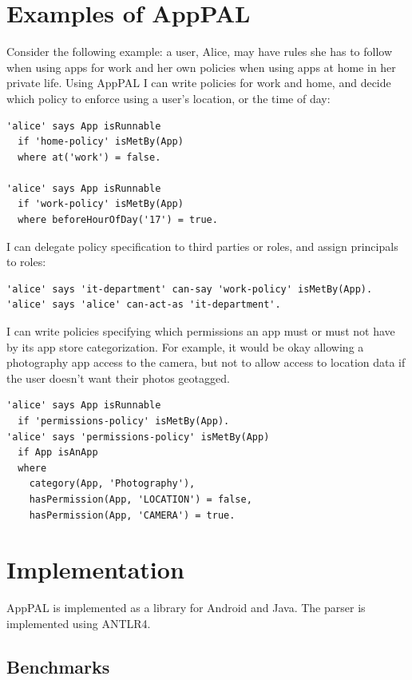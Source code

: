 \documentclass[thesis.tex]{subfiles}
\begin{document}
\section{Examples of AppPAL}

Consider the following example: a user, Alice, may have rules she has to follow
when using apps for work and her own policies when using apps at home in her
private life. Using AppPAL I can write policies for work and home, and decide
which policy to enforce using a user's location, or the time of day:

\begin{lstlisting}
'alice' says App isRunnable
  if 'home-policy' isMetBy(App)
  where at('work') = false.

'alice' says App isRunnable
  if 'work-policy' isMetBy(App)
  where beforeHourOfDay('17') = true.
\end{lstlisting}

I can delegate policy specification to third parties or roles, and assign principals to roles:

\begin{lstlisting}
'alice' says 'it-department' can-say 'work-policy' isMetBy(App).
'alice' says 'alice' can-act-as 'it-department'.
\end{lstlisting}

I can write policies specifying which permissions an app must or must not have
by its app store categorization. For example, it would be okay allowing a
photography app access to the camera, but not to allow access to location data
if the user doesn't want their photos geotagged.

\begin{lstlisting}
'alice' says App isRunnable
  if 'permissions-policy' isMetBy(App).
'alice' says 'permissions-policy' isMetBy(App)
  if App isAnApp
  where
    category(App, 'Photography'),
    hasPermission(App, 'LOCATION') = false,
    hasPermission(App, 'CAMERA') = true.
\end{lstlisting}

\section{Implementation}

AppPAL is implemented as a library for Android and Java.
The parser is implemented using ANTLR4.

\subsection{Benchmarks}
\label{ssec:benchmarks}
\end{document}
